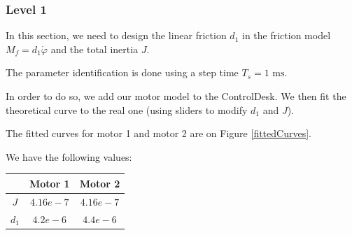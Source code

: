 \subsubsection*{Level 1}



In this section, we need to design the linear friction $d_1$ in the friction model $M_f = d_1 \dot{\varphi}$ and the total inertia $J$.

The parameter identification is done using a step time $T_s = 1 \text{ ms}$.

In order to do so, we add our motor model to the ControlDesk. We then fit the theoretical curve to the real one (using sliders to modify $d_1$ and $J$). 

The fitted curves for motor 1 and motor 2 are on Figure \ref{fittedCurves}. %

We have the following values:

\begin{center}
\begin{tabular}{|c|c|c|}
 \hline
 & Motor 1 & Motor 2 \\
 \hline 
 $J$ & $4.16e-7$ & $4.16e-7$ \\ 
 \hline 
 $d_1$ & $4.2e-6$ & $4.4e-6$  \\
 \hline
\end{tabular}
\end{center}


